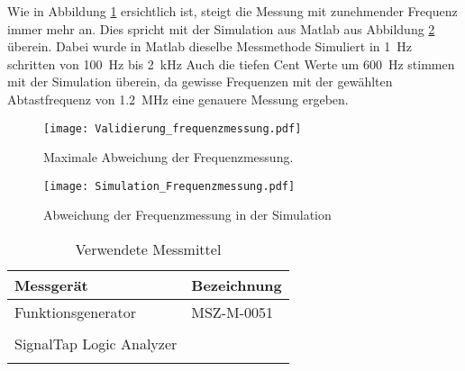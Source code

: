  Wie in Abbildung \ref{img:plot_frequenzmessung} ersichtlich ist, steigt die Messung mit zunehmender Frequenz immer mehr an. Dies spricht mit der Simulation aus Matlab aus Abbildung \ref{img:plot_freq_sim} überein. Dabei wurde in Matlab dieselbe Messmethode Simuliert in \SI{1}{Hz} schritten von \SI{100}{Hz} bis \SI{2}{kHz} Auch die tiefen Cent Werte um \SI{600}{Hz} stimmen mit der Simulation überein, da gewisse Frequenzen mit der gewählten Abtastfrequenz von \SI{1.2}{MHz} eine genauere Messung ergeben.
 \begin{figure}[h]
 	\centering
 	\texttt{[image: Validierung\_frequenzmessung.pdf]}
 	\caption{Maximale Abweichung der Frequenzmessung.}
 	\label{img:plot_frequenzmessung}
 \end{figure}
 \begin{figure}[h]
	\centering
	\texttt{[image: Simulation\_Frequenzmessung.pdf]}
	\caption{Abweichung der Frequenzmessung in der Simulation}
	\label{img:plot_freq_sim}
\end{figure}
\begin{table}[H]
	\centering
	\caption{Verwendete Messmittel}
	\label{tab:Verwendete_Messmittel_freq}
	\begin{tabular}{l|l}
		\textbf{Messgerät} & \textbf{Bezeichnung}	\\
		\hline \hline
		
		Funktionsgenerator  & MSZ-M-0051   \\ 
		&        \\ 
		\hline
		SignalTap Logic Analyzer  &    \\ 
		&        \\ 
			\hline
	\end{tabular}
\end{table} 

\pagebreak
